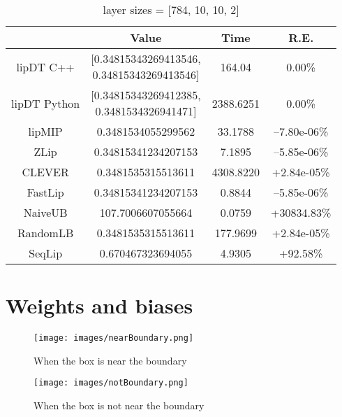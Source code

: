 \documentclass[11pt]{article}
\begin{document}
\begin{table}[ht]
\centering
\caption{layer sizes = [784, 10, 10, 2]}
\begin{tabular}{|c|c|c|c|}
\hline
                & Value                                     & Time       & R.E.\\ \hline
lipDT C++ & \makecell*[c]{[0.34815343269413546,\\ 0.34815343269413546]}  & 164.04 & 0.00\%\\ \hline
lipDT Python & \makecell*[c]{[0.34815343269412385,\\ 0.3481534326941471]}  & 2388.6251 & 0.00\%\\ \hline
lipMIP          & 0.3481534055299562                        & 33.1788   & --7.80e-06\%\\ \hline
ZLip            & 0.34815341234207153                       & 7.1895    & --5.85e-06\%\\ \hline
CLEVER          & 0.3481535315513611						& 4308.8220 & +2.84e-05\%\\ \hline
FastLip         & 0.34815341234207153						& 0.8844    & --5.85e-06\%\\ \hline
NaiveUB         & 107.7006607055664							& 0.0759     & +30834.83\%\\ \hline
RandomLB        & 0.3481535315513611						& 177.9699  & +2.84e-05\%\\ \hline
SeqLip          & 0.670467323694055                                                                                                                                & 4.9305    & +92.58\%\\ \hline
\end{tabular}
\end{table}

\section{Weights and biases}
\begin{figure}[H]
    \centering
    \texttt{[image: images/nearBoundary.png]}
    \caption{When the box is near the boundary}
    \label{fig:nearBoundary}
\end{figure}
\begin{figure}[H]
    \centering
    \texttt{[image: images/notBoundary.png]}
    \caption{When the box is not near the boundary}
    \label{fig:notBoundary}
\end{figure}
\end{document}
